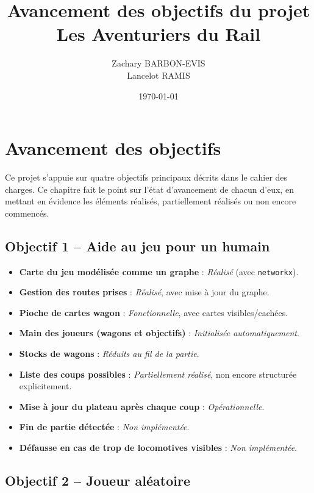\documentclass[a4paper,12pt]{report}
\title{Avancement des objectifs du projet \\ \textbf{Les Aventuriers du Rail}}
\author{Zachary BARBON-EVIS \\ Lancelot RAMIS}
\date{\today}
\begin{document}
\maketitle
\tableofcontents
\newpage

\chapter*{Avancement des objectifs}

Ce projet s'appuie sur quatre objectifs principaux décrits dans le cahier des charges. Ce chapitre fait le point sur l'état d'avancement de chacun d'eux, en mettant en évidence les éléments réalisés, partiellement réalisés ou non encore commencés.

\section*{Objectif 1 – Aide au jeu pour un humain}

\begin{itemize}
    \item \textbf{Carte du jeu modélisée comme un graphe} : \textit{Réalisé} (avec \texttt{networkx}).
    \item \textbf{Gestion des routes prises} : \textit{Réalisé}, avec mise à jour du graphe.
    \item \textbf{Pioche de cartes wagon} : \textit{Fonctionnelle}, avec cartes visibles/cachées.
    \item \textbf{Main des joueurs (wagons et objectifs)} : \textit{Initialisée automatiquement}.
    \item \textbf{Stocks de wagons} : \textit{Réduits au fil de la partie}.
    \item \textbf{Liste des coups possibles} : \textit{Partiellement réalisé}, non encore structurée explicitement.
    \item \textbf{Mise à jour du plateau après chaque coup} : \textit{Opérationnelle}.
    \item \textbf{Fin de partie détectée} : \textit{Non implémentée}.
    \item \textbf{Défausse en cas de trop de locomotives visibles} : \textit{Non implémentée}.
\end{itemize}

\section*{Objectif 2 – Joueur aléatoire}
\end{document}
